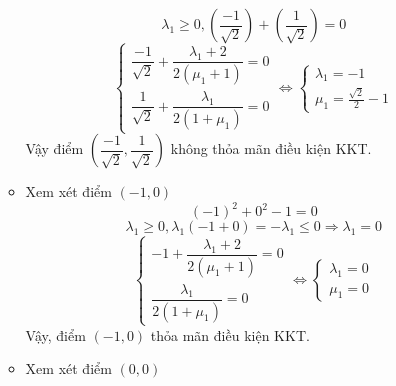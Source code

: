 \begin{solution}
\begin{enumerate}[label=(\alph*)]
\begin{itemize}
\begin{equation}
            \end{equation}
            \begin{equation}
                \lambda_1 \geq 0, \left(\dfrac{-1}{\sqrt{2}}\right) +  \left(\dfrac{1}{\sqrt{2}}\right) = 0
            \end{equation}
            \begin{equation}
                \begin{cases}
                    \dfrac{-1}{\sqrt{2}} + \dfrac{\lambda_1 + 2}{2(\mu_1 + 1)} = 0 \\
                    \dfrac{1}{\sqrt{2}} + \dfrac{\lambda_1}{2(1+\mu_1)} = 0
                \end{cases}
                \Leftrightarrow
                \begin{cases}
                    \lambda_1 = -1 \\
                    \mu_1 = \frac{\sqrt{2}}{2}-1
                \end{cases}
            \end{equation}
            Vậy điểm $\left(\dfrac{-1}{\sqrt{2}}, \dfrac{1}{\sqrt{2}}\right)$ không thỏa mãn điều kiện KKT.
            \item Xem xét điểm $(-1, 0)$
            \begin{equation}
                (-1)^2 + 0^2 - 1 = 0
            \end{equation}
            \begin{equation}
                \lambda_1 \geq 0, \lambda_1(-1 + 0) = -\lambda_1 \leq 0 \Rightarrow \lambda_1 = 0
            \end{equation}
            \begin{equation}
                \begin{cases}
                     -1 + \dfrac{\lambda_1 + 2}{2(\mu_1 + 1)} = 0 \\
                        \dfrac{\lambda_1}{2(1+\mu_1)} = 0
                \end{cases}
                \Leftrightarrow
                \begin{cases}
                    \lambda_1 = 0 \\ 
                    \mu_1 = 0
                \end{cases}
            \end{equation}
            Vậy, điểm $(-1, 0)$ thỏa mãn điều kiện KKT.
            \item Xem xét điểm $(0, 0)$
            \begin{equation}

\end{equation}
\end{itemize}
\end{enumerate}
\end{solution}
